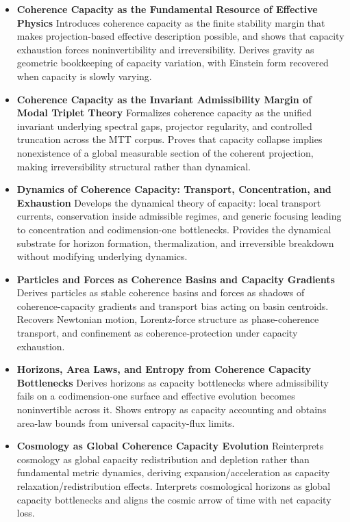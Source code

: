 \documentclass[11pt]{article}
\begin{document}
\begin{itemize}

\item \textbf{Coherence Capacity as the Fundamental Resource of Effective Physics}
Introduces coherence capacity as the finite stability margin that makes projection-based effective description possible, and shows that capacity exhaustion forces noninvertibility and irreversibility. Derives gravity as geometric bookkeeping of capacity variation, with Einstein form recovered when capacity is slowly varying.

\item \textbf{Coherence Capacity as the Invariant Admissibility Margin of Modal Triplet Theory}
Formalizes coherence capacity as the unified invariant underlying spectral gaps, projector regularity, and controlled truncation across the MTT corpus. Proves that capacity collapse implies nonexistence of a global measurable section of the coherent projection, making irreversibility structural rather than dynamical.

\item \textbf{Dynamics of Coherence Capacity: Transport, Concentration, and Exhaustion}
Develops the dynamical theory of capacity: local transport currents, conservation inside admissible regimes, and generic focusing leading to concentration and codimension-one bottlenecks. Provides the dynamical substrate for horizon formation, thermalization, and irreversible breakdown without modifying underlying dynamics.

\item \textbf{Particles and Forces as Coherence Basins and Capacity Gradients}
Derives particles as stable coherence basins and forces as shadows of coherence-capacity gradients and transport bias acting on basin centroids. Recovers Newtonian motion, Lorentz-force structure as phase-coherence transport, and confinement as coherence-protection under capacity exhaustion.

\item \textbf{Horizons, Area Laws, and Entropy from Coherence Capacity Bottlenecks}
Derives horizons as capacity bottlenecks where admissibility fails on a codimension-one surface and effective evolution becomes noninvertible across it. Shows entropy as capacity accounting and obtains area-law bounds from universal capacity-flux limits.

\item \textbf{Cosmology as Global Coherence Capacity Evolution}
Reinterprets cosmology as global capacity redistribution and depletion rather than fundamental metric dynamics, deriving expansion/acceleration as capacity relaxation/redistribution effects. Interprets cosmological horizons as global capacity bottlenecks and aligns the cosmic arrow of time with net capacity loss.


\end{itemize}
\end{document}

